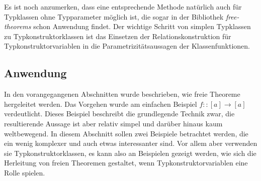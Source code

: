 Es ist noch anzumerken, dass eine entsprechende Methode natürlich auch für Typklassen ohne Typparameter möglich ist,
die sogar in der Bibliothek \textit{free-theorems} schon Anwendung findet. Der wichtige Schritt von simplen Typklassen
zu Typkonstruktorklassen ist das Einsetzen der Relationskonstruktion für Typkonstruktorvariablen in die Parametrizitätsaussagen
der Klassenfunktionen. 





\subsection{Anwendung}

\label{sec:freie-theoreme-anwendung}


In den vorangegangenen Abschnitten wurde beschrieben, wie freie Theoreme hergeleitet werden. Das Vorgehen wurde am einfachen
Beispiel $f :: [a] \rightarrow [a]$ verdeutlicht. Dieses Beispiel beschreibt die grundlegende Technik zwar, die resultierende
Aussage ist aber relativ simpel und darüber hinaus kaum weltbewegend. 
In diesem Abschnitt sollen zwei Beispiele betrachtet werden, die ein wenig komplexer und auch etwas interessanter sind. Vor
allem aber verwenden sie Typkonstruktorklassen, es kann also an Beispielen gezeigt werden, wie sich die Herleitung
von freien Theoremen gestaltet, wenn Typkonstruktorvariablen eine Rolle spielen.

